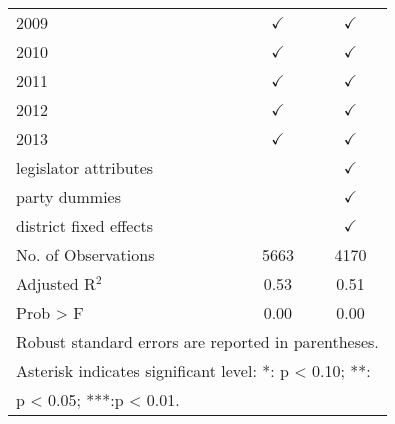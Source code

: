 \begin{table}[ht]
\begin{tabular}{lcc}
\footnotesize{2009}             & $\checkmark$         & $\checkmark$  \tabularnewline
\footnotesize{2010}             & $\checkmark$         & $\checkmark$  \tabularnewline
\footnotesize{2011}             & $\checkmark$         & $\checkmark$  \tabularnewline
\footnotesize{2012}             & $\checkmark$         & $\checkmark$  \tabularnewline
\footnotesize{2013}             & $\checkmark$         & $\checkmark$  \tabularnewline
\footnotesize{legislator attributes}       &           & $\checkmark$  \tabularnewline
\footnotesize{party dummies}               &           & $\checkmark$  \tabularnewline
\footnotesize{district fixed effects}      &           & $\checkmark$  \tabularnewline
\midrule
\footnotesize{No. of Observations}         & \footnotesize{5663}      & \footnotesize{4170}         \tabularnewline
\footnotesize{Adjusted R$^{2}$}            & \footnotesize{0.53}      & \footnotesize{0.51}         \tabularnewline
\footnotesize{Prob > F}                    & \footnotesize{0.00}      & \footnotesize{0.00}         \tabularnewline
\midrule
\multicolumn{3}{l}{{\footnotesize{}Robust standard errors are reported in parentheses.}}           \tabularnewline
\multicolumn{3}{l}{{\footnotesize{}Asterisk indicates significant level: {*}: p < 0.10; {*}{*}:}}    \tabularnewline
\multicolumn{3}{l}{{\footnotesize{} p < 0.05; {*}{*}{*}:p < 0.01.}}                                   \tabularnewline
\end{tabular}
\end{table}